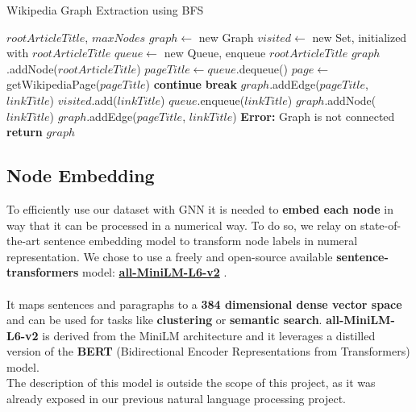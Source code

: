 \documentclass[11pt]{article}
\begin{document}
	\begin{algorithm}
		\caption{Wikipedia Graph Extraction using BFS}
		\begin{algorithmic}[1]
			\Require $rootArticleTitle$, $maxNodes$
			\State $graph \gets$ new Graph
			\State $visited \gets$ new Set, initialized with $rootArticleTitle$
			\State $queue \gets$ new Queue, enqueue $rootArticleTitle$
			\State $graph$.addNode($rootArticleTitle$)
			\State $pageTitle \gets queue$.dequeue()
			\State $page \gets$ getWikipediaPage($pageTitle$) 
			\State \textbf{continue} 
			\EndIf
			\State \textbf{break} 
			\EndIf
			\State $graph$.addEdge($pageTitle$, $linkTitle$)
			\Else
			\State $visited$.add($linkTitle$)
			\State $queue$.enqueue($linkTitle$)
			\State $graph$.addNode($linkTitle$)
			\State $graph$.addEdge($pageTitle$, $linkTitle$)
			\EndIf
			\EndFor
			\EndWhile
			\State \textbf{Error:} Graph is not connected
			\EndIf
			\State \textbf{return} $graph$
		\end{algorithmic}
		\label{alg_1}
	\end{algorithm}
	
	\subsection{Node Embedding}
	\label{node_embedding}
	To efficiently use our dataset with GNN it is needed to \textbf{embed each node} in way that it can be processed in a numerical way. To do so, we relay on state-of-the-art sentence embedding model to transform node labels in numeral representation.
	We chose to use a freely and open-source available \textbf{sentence-transformers} model: \textbf{\href{https://huggingface.co/sentence-transformers/all-MiniLM-L6-v2}{all-MiniLM-L6-v2}} \cite{reimers-2019-sentence-bert}. \\\\
	It maps sentences and paragraphs to a \textbf{384 dimensional dense vector space} and can be used for tasks like \textbf{clustering} or \textbf{semantic search}.
	\textbf{all-MiniLM-L6-v2} is derived from the MiniLM \cite{wang2020minilmdeepselfattentiondistillation} architecture and it leverages a distilled version of the \textbf{BERT} (Bidirectional Encoder Representations from Transformers) \cite{devlin2019bertpretrainingdeepbidirectional} model.\\
	The description of this model is outside the scope of this project, as it was already exposed in our previous natural language processing project.
	
\end{document}
